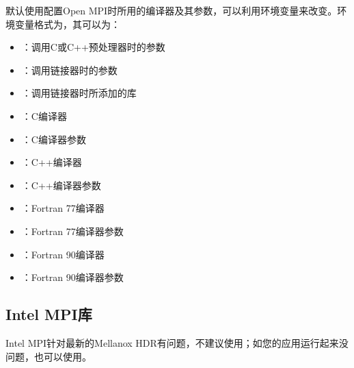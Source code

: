 \documentclass[a4paper,12pt,english]{sphinxmanual}
\begin{document}
\sphinxAtStartPar
默认使用配置Open MPI时所用的编译器及其参数，可以利用环境变量来改变。环境变量格式为，其可以为：
\begin{itemize}
\item {} 
\sphinxAtStartPar
{}：调用C或C++预处理器时的参数

\item {} 
\sphinxAtStartPar
{}：调用链接器时的参数

\item {} 
\sphinxAtStartPar
{}：调用链接器时所添加的库

\item {} 
\sphinxAtStartPar
{}：C编译器

\item {} 
\sphinxAtStartPar
{}：C编译器参数

\item {} 
\sphinxAtStartPar
{}：C++编译器

\item {} 
\sphinxAtStartPar
{}：C++编译器参数

\item {} 
\sphinxAtStartPar
{}：Fortran 77编译器

\item {} 
\sphinxAtStartPar
{}：Fortran 77编译器参数

\item {} 
\sphinxAtStartPar
{}：Fortran 90编译器

\item {} 
\sphinxAtStartPar
{}：Fortran 90编译器参数

\end{itemize}


\subsection{Intel MPI库}
\label{\detokenize{mpi-application/mpi-application:intel-mpi}}
\sphinxAtStartPar
Intel MPI针对最新的Mellanox HDR有问题，不建议使用；如您的应用运行起来没问题，也可以使用。
\end{document}
